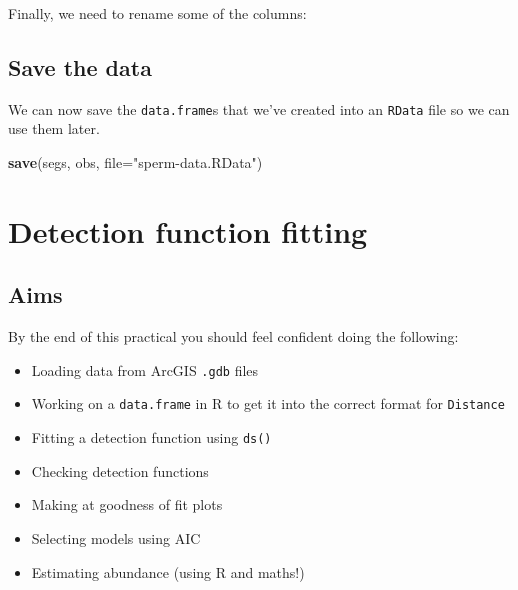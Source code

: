 \documentclass[]{book}
\newenvironment{Shaded}{\begin{snugshade}}{\end{snugshade}}
\newcommand{\KeywordTok}[1]{\textcolor[rgb]{0.13,0.29,0.53}{\textbf{#1}}}
\newcommand{\DataTypeTok}[1]{\textcolor[rgb]{0.13,0.29,0.53}{#1}}
\newcommand{\StringTok}[1]{\textcolor[rgb]{0.31,0.60,0.02}{#1}}
\newcommand{\OperatorTok}[1]{\textcolor[rgb]{0.81,0.36,0.00}{\textbf{#1}}}
\newcommand{\NormalTok}[1]{#1}
\providecommand{\tightlist}{%
  \setlength{\itemsep}{0pt}\setlength{\parskip}{0pt}}
\theoremstyle{definition}
\theoremstyle{definition}
\theoremstyle{remark}
\begin{document}
Finally, we need to rename some of the columns:

\begin{Shaded}
\end{Shaded}

\section{Save the data}\label{save-the-data}

We can now save the \texttt{data.frame}s that we've created into an
\texttt{RData} file so we can use them later.

\begin{Shaded}
\begin{Highlighting}[]
\KeywordTok{save}\NormalTok{(segs, obs, }\DataTypeTok{file=}\StringTok{"sperm-data.RData"}\NormalTok{)}
\end{Highlighting}
\end{Shaded}

\chapter{Detection function fitting}\label{detection-function-fitting}

\section{Aims}\label{aims-1}

By the end of this practical you should feel confident doing the
following:

\begin{itemize}
\tightlist
\item
  Loading data from ArcGIS \texttt{.gdb} files
\item
  Working on a \texttt{data.frame} in R to get it into the correct
  format for \texttt{Distance}
\item
  Fitting a detection function using \texttt{ds()}
\item
  Checking detection functions
\item
  Making at goodness of fit plots
\item
  Selecting models using AIC
\item
  Estimating abundance (using R and maths!)
\end{itemize}
\end{document}
